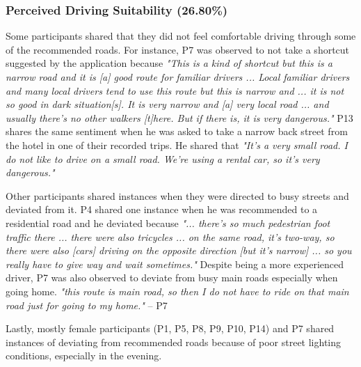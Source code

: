 \subsubsection{Perceived Driving Suitability (26.80\%)}
Some participants shared that they did not feel comfortable driving through some of the recommended roads. For instance, P7 was observed to not take a shortcut suggested by the application because \emph{"This is a kind of shortcut but this is a narrow road and it is [a] good route for familiar drivers ... Local familiar drivers and many local drivers tend to use this route but this is narrow and ... it is not so good in dark situation[s]. It is very narrow and [a] very local road ... and usually there's no other walkers [t]here. But if there is, it is very dangerous."} P13 shares the same sentiment when he was asked to take a narrow back street from the hotel in one of their recorded trips. He shared that \emph{"It's a very small road. I do not like to drive on a small road. We're using a rental car, so it's very dangerous."}

Other participants shared instances when they were directed to busy streets and deviated from it. P4 shared one instance when he was recommended to a residential road and he deviated because \emph{"... there's so much pedestrian foot traffic there ... there were also tricycles ... on the same road, it's two-way, so there were also [cars] driving on the opposite direction [but it's narrow] ... so you really have to give way and wait sometimes."} Despite being a more experienced driver, P7 was also observed to deviate from busy main roads especially when going home. \emph{"this route is main road, so then I do not have to ride on that main road just for going to my home."} -- P7

Lastly, mostly female participants (P1, P5, P8, P9, P10, P14) and P7 shared instances of deviating from recommended roads because of poor street lighting conditions, especially in the evening. 


